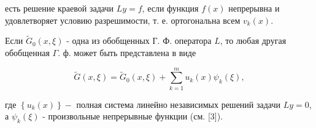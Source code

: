 \documentclass[10pt]{article}
\begin{document}
есть решение краевой задачи $L y=f$, если функция $f(x)$ непрерывна и удовлетворяет условию разрешимости, т. е. ортогональна всем $v_{k}(x)$.



Если $\tilde{G}_{0}(x, \xi)$ - одна из обобщенных Г. Ф. оператора $L$, то любая другая обобщенная $\Gamma$. ф. может быть представлена в виде



\[

\tilde{G}(x, \xi)=\tilde{G}_{0}(x, \xi)+\sum_{k=1}^{m} u_{k}(x) \psi_{k}(\xi),

\]



где $\left\{u_{k}(x)\right\}-$ полная система линейно независимых решений задачи $L y=0$, а $\psi_{k}(\xi)$ - произвольные непрерывные функции (см. [3]).
\end{document}
